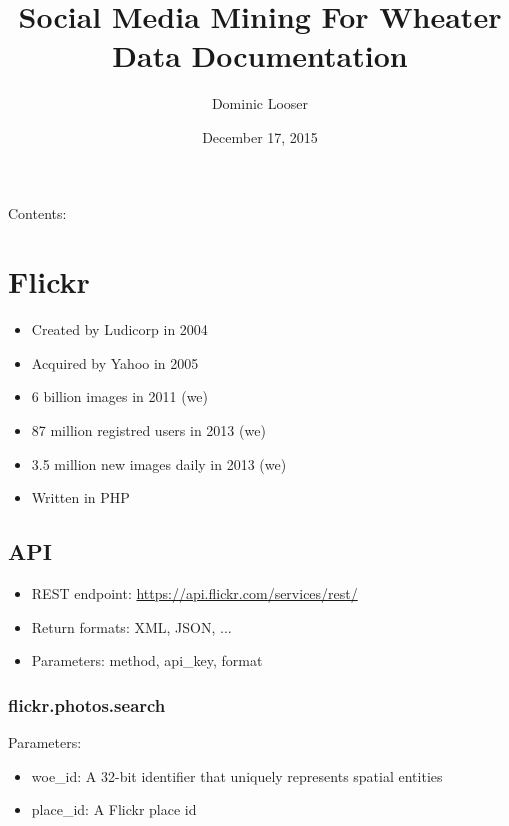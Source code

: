 \documentclass[letterpaper,10pt,english]{sphinxmanual}
\title{Social Media Mining For Wheater Data Documentation}
\date{December 17, 2015}
\author{Dominic Looser}
\begin{document}
\maketitle
\tableofcontents
{}\label{index::doc}


Contents:


\chapter{Flickr}
\label{main/flickr:social-media-mining-for-wheater-data}\label{main/flickr:flickr}\label{main/flickr::doc}\begin{itemize}
\item {} 
Created by Ludicorp in 2004

\item {} 
Acquired by Yahoo in 2005

\item {} 
6 billion images in 2011 (we)

\item {} 
87 million registred users in 2013 (we)

\item {} 
3.5 million new images daily in 2013 (we)

\item {} 
Written in PHP

\end{itemize}


\section{API}
\label{main/flickr:api}\begin{itemize}
\item {} 
REST endpoint: \href{https://api.flickr.com/services/rest/}{https://api.flickr.com/services/rest/}

\item {} 
Return formats: XML, JSON, ...

\item {} 
Parameters: method, api\_key, format

\end{itemize}


\subsection{flickr.photos.search}
\label{main/flickr:flickr-photos-search}
Parameters:
\begin{itemize}
\item {} 
woe\_id: A 32-bit identifier that uniquely represents spatial entities

\item {} 
place\_id: A Flickr place id

\end{itemize}
\end{document}
